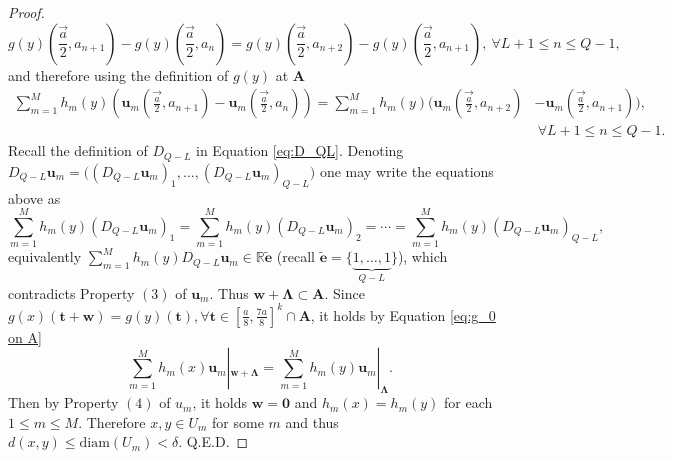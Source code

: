 \documentclass[11pt]{article}
\theoremstyle{plain}
\theoremstyle{definition}
\def\tt{\mathbf t}
\def\AA{\mathbf A}
\def\LL{\mathbf \Lambda}
\numberwithin{figure}{section}
\begin{document}
\begin{proof}
    \begin{equation*}
        g(y)(\vec{\frac{a}{2}},a_{n+1})-g(y)(\vec{\frac{a}{2}},a_n)=g(y)(\vec{\frac{a}{2}},a_{n+2})-g(y)(\vec{\frac{a}{2}},a_{n+1}),~\forall L+1\leq n\leq Q-1,
    \end{equation*}
    and therefore using the definition of $g(y)$ at $\AA$
    \begin{equation*}
    \begin{split}
        \sum\limits_{m=1}^{M}h_{m}(y)(\mathbf u_m(\vec{\frac{a}{2}},a_{n+1})-\mathbf u_m(\vec{\frac{a}{2}},a_n))=\sum\limits_{m=1}^{M}h_{m}(y)(\mathbf u_m(\vec{\frac{a}{2}},a_{n+2})&-\mathbf u_m(\vec{\frac{a}{2}},a_{n+1})),\\
        &~\forall L+1\leq n\leq Q-1.
    \end{split}
    \end{equation*}
    Recall  the definition of $D_{Q-L}$ in Equation \eqref{eq:D_QL}.
   Denoting $D_{Q-L}\mathbf u_m=\big((D_{Q-L}\mathbf u_m)_1,\ldots,  (D_{Q-L}\mathbf u_m)_{Q-L} \big)$ one may write the equations above as 
    $$
\sum\limits_{m=1}^{M}h_{m}(y)(D_{Q-L}\mathbf u_m)_1=\sum\limits_{m=1}^{M}h_{m}(y)(D_{Q-L}\mathbf u_m)_2=\cdots=\sum\limits_{m=1}^{M}h_{m}(y)(D_{Q-L}\mathbf u_m)_{Q-L},
    $$
    equivalently $\sum\limits_{m=1}^{M}h_{m}(y)D_{Q-L}\mathbf u_m\in\mathbb{R}\widetilde{\mathbf e}$ (recall $\widetilde{\mathbf e}=\{\underbrace{1,\ldots,1}_{Q-L}\}$), which contradicts  Property $(3)$ of $\mathbf u_m$. Thus $\mathbf w+\LL\subset \mathbf{A}$. 
        Since $g(x)(\mathbf {t+w})=g(y)(\tt), \forall \mathbf t\in[\frac{a}{8},\frac{7a}{8}]^k\cap \AA$, it holds by Equation \eqref{eq:g_0 on A}
    \begin{equation*}
        \sum\limits_{m=1}^{M}h_{m}(x)\mathbf u_m|_{\mathbf w+\LL}=\sum\limits_{m=1}^{M}h_{m}(y)\mathbf u_m|_{\LL}.
    \end{equation*}
    Then by Property $(4)$ of $u_m$, it holds $\mathbf w=\mathbf{0}$ and $h_{m}(x)=h_{m}(y)$ for each $1\leq m\leq M$. Therefore $x,y\in U_m$ for some $m$ and thus $d(x,y)\leq\text{diam}(U_m)<\delta$. Q.E.D.
    
\end{proof}
\end{document}
